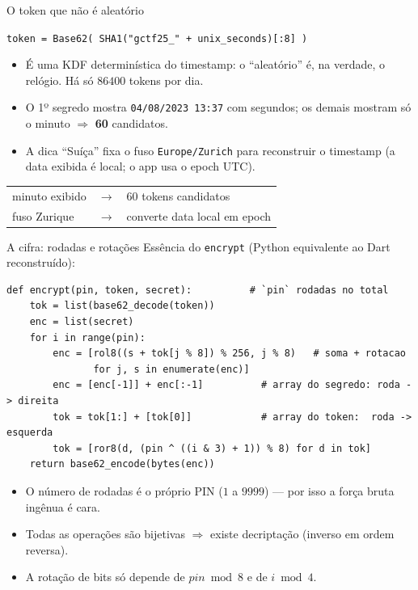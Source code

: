 \documentclass[aspectratio=169]{beamer}
\begin{document}
\begin{frame}{O token que não é aleatório}
  \begin{center}
    {\small \texttt{token = Base62( SHA1("gctf25\_" + unix\_seconds)[:8] )}}
  \end{center}
  \begin{itemize}
    \item É uma \alert{KDF determinística do timestamp}: o ``aleatório'' é, na
          verdade, o relógio. Há só $86400$ tokens por dia.
    \item O 1º segredo mostra \texttt{04/08/2023 13:37} \alert{com segundos};
          os demais mostram só o minuto $\Rightarrow$ \textbf{60} candidatos.
    \item A dica ``Suíça'' fixa o fuso \texttt{Europe/Zurich} para reconstruir
          o timestamp (a data exibida é local; o app usa o epoch UTC).
  \end{itemize}
  \begin{center}
    \begin{tabular}{@{}l l l@{}}
      minuto exibido & $\longrightarrow$ & 60 tokens candidatos \\
      fuso Zurique   & $\longrightarrow$ & converte data local em epoch \\
    \end{tabular}
  \end{center}
\end{frame}

\begin{frame}[fragile]{A cifra: rodadas e rotações}
  Essência do \texttt{encrypt} (Python equivalente ao Dart reconstruído):
  \begin{lstlisting}[basicstyle=\ttfamily\scriptsize]
def encrypt(pin, token, secret):          # `pin` rodadas no total
    tok = list(base62_decode(token))
    enc = list(secret)
    for i in range(pin):
        enc = [rol8((s + tok[j % 8]) % 256, j % 8)   # soma + rotacao
               for j, s in enumerate(enc)]
        enc = [enc[-1]] + enc[:-1]          # array do segredo: roda -> direita
        tok = tok[1:] + [tok[0]]            # array do token:  roda -> esquerda
        tok = [ror8(d, (pin ^ ((i & 3) + 1)) % 8) for d in tok]
    return base62_encode(bytes(enc))
  \end{lstlisting}
  \begin{itemize}
    \item O número de rodadas é o \alert{próprio PIN} ($1$ a $9999$) --- por
          isso a força bruta ingênua é cara.
    \item Todas as operações são bijetivas $\Rightarrow$ existe decriptação
          (inverso em ordem reversa).
    \item A rotação de bits \alert{só depende de $pin \bmod 8$ e de $i \bmod 4$}.
  \end{itemize}
\end{frame}
\end{document}
